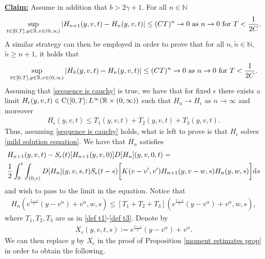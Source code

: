 \documentclass[11pt]{article}
\numberwithin{equation}{section}
\newcommand{\der}{\textup{d}}
\begin{document}
\vspace{0.1cm}

\textbf{\underline{Claim:}} Assume in addition that $b>2\gamma+1$. For all $n\in\mathbb{N}$
\begin{align}\label{sequence is cauchy}
\sup_{t\in[0,T], y\in\mathbb{R}, v\in(0,\infty)}|H_{n+1}(y,v,t)-H_{n}(y,v,t)|\leq (CT)^{n}\rightarrow 0
 \textup{ as } n\rightarrow 0 \textup{ for } T< \frac{1}{2C}.
 \end{align}
 A similar strategy can then be employed in order to prove that for all $n,\tilde{n}\in\mathbb{N}$, $\tilde{n}\geq n+1$, it holds that
 \begin{align*}
\sup_{t\in[0,T], y\in\mathbb{R}, v\in(0,\infty)}|H_{\tilde{n}}(y,v,t)-H_{n}(y,v,t)|\leq (CT)^{n}\rightarrow 0
 \textup{ as } n\rightarrow 0 \textup{ for } T< \frac{1}{2C}.
 \end{align*}
 Assuming that \eqref{sequence is cauchy} is true, we have that for fixed $\epsilon$ there exists a limit $H_{\epsilon}(y,v,t)\in \textup{C}([0,T];L^{\infty}(\mathbb{R}\times(0,\infty))$ such that $H_{n}\rightarrow H_{\epsilon}$ as $n\rightarrow \infty$ and moreover
 \begin{align*}
H_{\epsilon}(y,v,t)\leq T_{1}(y,v,t)+T_{2}(y,v,t)+T_{3}(y,v,t).
 \end{align*}
 Thus, assuming \eqref{sequence is cauchy} holds, what is left to prove is that $H_{\epsilon}$ solves \eqref{mild solution equation}. We have that $H_{n}$ satisfies
\begin{align*}
    &H_{n+1}(y,v,t)-S_{\epsilon}(t)[H_{n+1}(y,v,0) ] D[H_{n}](y,v,0,t)=\\
&\frac{1}{2}\int_{0}^{t}\int_{(0,v)}D[H_{n}](y,v,s,t)
S_{\epsilon}(t-s)\bigg[K(v-v',v')H_{n+1}(y,v-w,s) H_{n}(y,w,s)\bigg]\der s
\end{align*}
and wish to pass to the limit in the equation. Notice that
\begin{align}\label{bound hn new}
     H_{n}(e^{\frac{t-s}{\epsilon}}(y-v^{\alpha})+v^{\alpha},w,s)
      \leq [T_{1}+T_{2}+T_{3}](e^{\frac{t-s}{\epsilon}}(y-v^{\alpha})+v^{\alpha},w,s),
    \end{align}
where $T_{1},T_{2}, T_{3}$ are as in \eqref{def t1}-\eqref{def t3}.    Denote by
    \begin{align*}
        X_{\epsilon}(y,v,t,s):=e^{\frac{t-s}{\epsilon}}(y-v^{\alpha})+v^{\alpha}.
    \end{align*}
    We can then replace $y$ by $X_{\epsilon}$ in the proof of Proposition \ref{moment estimates prop} in order to obtain the following.
\end{document}
